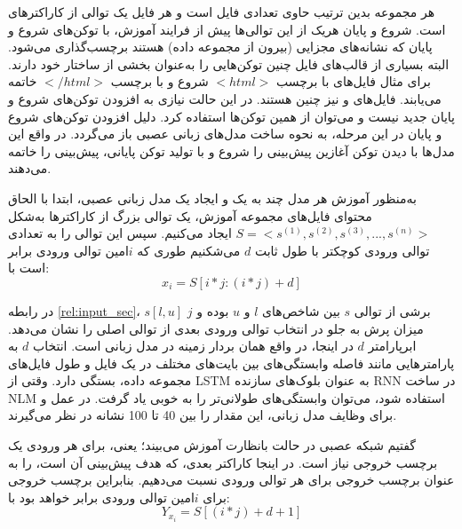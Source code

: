 هر مجموعه بدین ترتیب حاوی تعدادی فایل است و هر فایل یک توالی از کاراکتر‌های  است. شروع و پایان هریک از این توالی‌ها پیش از فرایند آموزش، با توکن‌های شروع و پایان که نشانه‌های مجزایی (بیرون از مجموعه داده) هستند برچسب‌گذاری‌ می‌شود. البته بسیاری از قالب‌های فایل چنین توکن‌هایی را به‌عنوان بخشی از ساختار خود دارند. برای مثال فایل‌های  با برچسب $ <html> $ شروع و با برچسب $ </html> $ خاتمه می‌یابند. فایل‌های  و  نیز چنین هستند. در این حالت نیازی به افزودن توکن‌های شروع و پایان جدید نیست و می‌توان از همین توکن‌ها استفاده کرد. دلیل افزودن توکن‌های شروع و پایان در این مرحله، به نحوه ساخت مدل‌های زبانی عصبی باز‌ می‌گردد. در واقع این مدل‌ها با دیدن توکن آغازین پیش‌بینی را شروع و با تولید توکن پایانی، پیش‌بینی را خاتمه می‌دهند.


به‌منظور آموزش هر مدل چند به یک و ایجاد یک مدل زبانی عصبی، ابتدا با الحاق محتوای فایل‌های مجموعه آموزش، یک توالی بزرگ از کاراکترها به‌شکل  
$ S = <s^{(1)}, s^{(2)}, s^{(3)}, ..., s^{(n)}> $
 ایجاد می‌کنیم. سپس این توالی را به تعدادی توالی ورودی کوچکتر با طول ثابت $ d $ می‌شکنیم طوری که $i$امین توالی ورودی برابر است با:
 \begin{equation}\label{rel:input_sec}
 	x_i=S[i*j:(i*j)+d]
 \end{equation}
  
  در رابطه 
  \ref{rel:input_sec}،
  $s[l,u]$
   برشی از توالی $s$ بین شاخص‌های $l$ و $u$ بوده و $j$ میزان پرش به جلو در انتخاب توالی ورودی بعدی از توالی اصلی را نشان می‌دهد. ابرپارامتر $d$
   در اینجا، در واقع همان بردار زمینه در مدل زبانی است.
   انتخاب $d$ به پارامترهایی مانند فاصله وابستگی‌های بین بایت‌های مختلف در یک فایل و طول فایل‌های مجموعه‌ داده، بستگی دارد. وقتی از 
   \gls{LSTM}
   به عنوان بلوک‌های سازنده 
   \gls{RNN}
   در ساخت 
   \gls{NLM}
   استفاده شود، می‌توان وابستگی‌های طولانی‌تر را به خوبی یاد‌ گرفت. 
   در عمل و برای وظایف مدل زبانی، این مقدار را بین 40 تا 100 نشانه در نظر می‌گیرند.
   
   گفتیم شبکه عصبی در حالت بانظارت آموزش می‌بیند؛ یعنی، برای هر ورودی یک برچسب خروجی نیاز است. در اینجا کاراکتر بعدی، که هدف پیش‌بینی آن است، را به عنوان برچسب خروجی برای هر توالی ورودی نسبت می‌دهیم. بنابراین برچسب خروجی برای $i$امین توالی ورودی برابر خواهد بود با:
   \begin{equation}
   	 Y_{x_{i}} = S[(i*j) + d+1]
   \end{equation}
     
